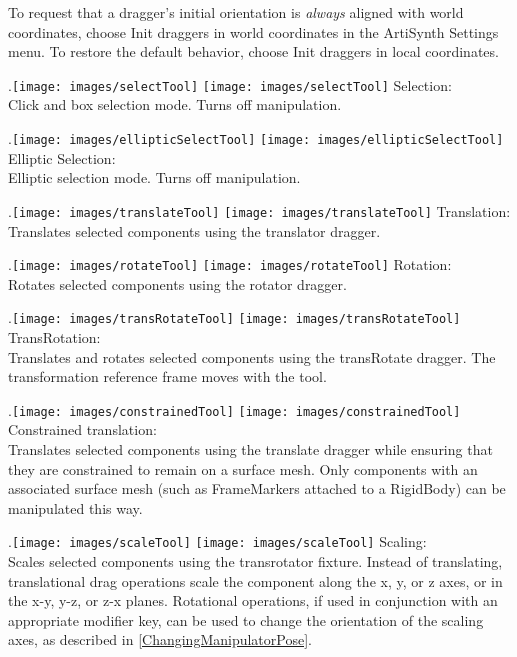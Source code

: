 \documentclass{article}
\begin{document}
To request that a dragger's initial orientation is {\it always}
aligned with world coordinates, choose {\sf Init draggers in world
coordinates} in the ArtiSynth {\sf Settings} menu. To restore the
default behavior, choose {\sf Init draggers in local coordinates}.

\iflatexml
.\texttt{[image: images/selectTool]}
\else
\texttt{[image: images/selectTool]}
\fi
{\sf Selection:}\\
Click and box selection mode. Turns off manipulation.

\vspace{\parskip}
\iflatexml
.\texttt{[image: images/ellipticSelectTool]}
\else
\texttt{[image: images/ellipticSelectTool]}
\fi
{\sf Elliptic Selection:}\\
Elliptic selection mode. Turns off manipulation.

\vspace{\parskip}
\iflatexml
.\texttt{[image: images/translateTool]}
\else
\texttt{[image: images/translateTool]}
\fi
{\sf Translation:}\\
Translates selected components using the translator dragger.

\vspace{\parskip}
\iflatexml
.\texttt{[image: images/rotateTool]}
\else
\texttt{[image: images/rotateTool]}
\fi
{\sf Rotation:}\\
Rotates selected components using the rotator dragger.

\vspace{\parskip}
\iflatexml
.\texttt{[image: images/transRotateTool]}
\else
\texttt{[image: images/transRotateTool]}
\fi
{\sf TransRotation:}\\
Translates and rotates selected components
using the transRotate dragger. The transformation reference frame
moves with the tool.

\vspace{\parskip}
\iflatexml
.\texttt{[image: images/constrainedTool]}
\else
\texttt{[image: images/constrainedTool]}
\fi 
{\sf Constrained translation:}\\
Translates selected components using the translate dragger while ensuring that
they are constrained to remain on a surface mesh. Only components with
an associated surface mesh (such as FrameMarkers attached to a
RigidBody) can be manipulated this way.

\vspace{\parskip}
\iflatexml
.\texttt{[image: images/scaleTool]}
\else
\texttt{[image: images/scaleTool]}
\fi
{\sf Scaling:}\\
Scales selected components using the transrotator
fixture. Instead of translating, translational drag operations
scale the component along the x, y, or z axes, or in the
x-y, y-z, or z-x planes. Rotational operations, if
used in conjunction with an appropriate modifier key,
can be used to change the orientation of the scaling axes,
as described in \ref{ChangingManipulatorPose}.
\end{document}
